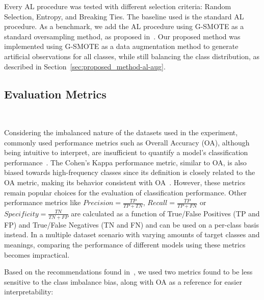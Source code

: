 Every AL procedure was tested with different selection criteria: Random
Selection, Entropy, and Breaking Ties. The baseline used is the standard
AL procedure. As a benchmark, we add the AL procedure using G-SMOTE as a
standard oversampling method, as proposed in~\cite{Fonseca2021al}. Our proposed
method was implemented using G-SMOTE as a data augmentation method to generate
artificial observations for all classes, while still balancing the class
distribution, as described in Section~\ref{sec:proposed_method-al-aug}. 
 
\subsection{Evaluation Metrics}~\label{sec:evaluation_metrics-al-aug}

Considering the imbalanced nature of the datasets used in the experiment,
commonly used performance metrics such as Overall Accuracy (OA), although
being intuitive to interpret, are insufficient to quantify a model's
classification performance~\cite{Jeni2013}. The Cohen's Kappa performance
metric, similar to OA, is also biased towards high-frequency classes
since its definition is closely related to the OA metric, making its behavior
consistent with OA~\cite{Fatourechi2008}. However, these metrics remain
popular choices for the evaluation of classification performance. Other
performance metrics like $Precision = \frac{TP}{TP+TN}$, $Recall =
\frac{TP}{TP+FN}$ or $Specificity = \frac{TN}{TN + FP}$ are calculated as a
function of True/False Positives (TP and FP) and True/False Negatives (TN and
FN) and can be used on a per-class basis instead. In a multiple dataset
scenario with varying amounts of target classes and meanings, comparing
the performance of different models using these metrics becomes impractical.
 
Based on the recommendations found in~\cite{Jeni2013, Kubat1997}, we used
two metrics found to be less sensitive to the class imbalance bias, along
with OA as a reference for easier interpretability:

